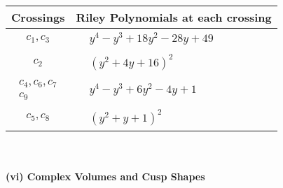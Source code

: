 \documentclass[1p]{elsarticle_modified}
\theoremstyle{definition}
\begin{document}
\begin{tabular}{m{50pt}|m{274pt}}
Crossings & \hspace{64pt}Riley Polynomials at each crossing \\
\hline $$\begin{aligned}c_{1},c_{3}\end{aligned}$$&$\begin{aligned}
&y^4- y^3+18 y^2-28 y+49
\end{aligned}$\\
\hline $$\begin{aligned}c_{2}\end{aligned}$$&$\begin{aligned}
&(y^2+4 y+16)^2
\end{aligned}$\\
\hline $$\begin{aligned}c_{4},c_{6},c_{7}\\c_{9}\end{aligned}$$&$\begin{aligned}
&y^4- y^3+6 y^2-4 y+1
\end{aligned}$\\
\hline $$\begin{aligned}c_{5},c_{8}\end{aligned}$$&$\begin{aligned}
&(y^2+y+1)^2
\end{aligned}$\\
\hline
\end{tabular}\\~\\
\newpage\flushleft \textbf{(vi) Complex Volumes and Cusp Shapes}
\end{document}

